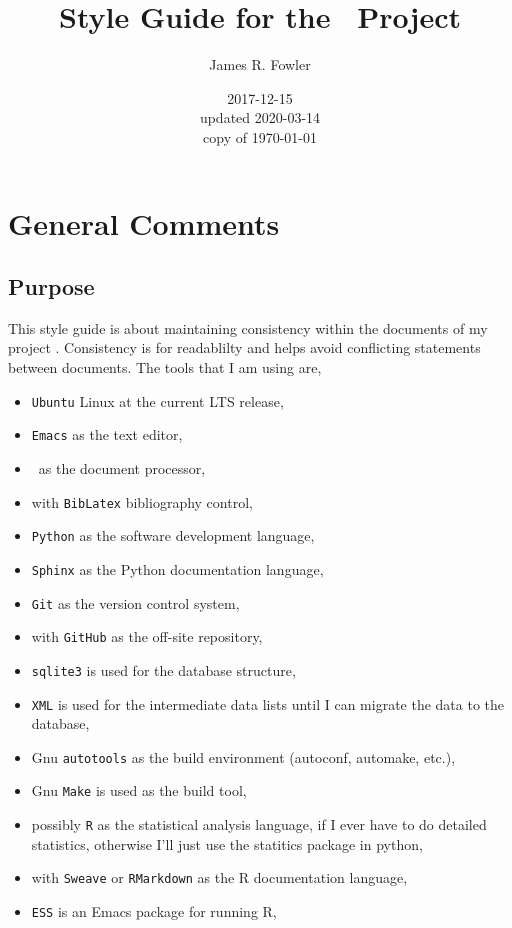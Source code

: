 \documentclass[twoside]{book}
\begin{document}
\frontmatter

\title{Style Guide for the \ProjectTitle\ Project}
\author{James R. Fowler}
\date{2017-12-15\\ updated 2020-03-14\\ copy of \today}

\maketitle

\tableofcontents

\mainmatter

\chapter{General Comments}

\section{Purpose}
This style guide is about maintaining consistency within the documents
of my project \ProjectTitle. Consistency is for readablilty and
helps avoid conflicting statements between documents. The tools
that I am using are,

\begin{itemize}
\item \texttt{Ubuntu} Linux at the current LTS release,
\item \texttt{Emacs} as the text editor,
\item \LaTeXe\ as the document processor,
\item with \texttt{BibLatex} bibliography control,
\item \texttt{Python} as the software development language,
\item \texttt{Sphinx} as the Python documentation language,
\item \texttt{Git} as the version control system,
\item with \texttt{GitHub} as the off-site repository,
\item \texttt{sqlite3} is used for the database structure,
\item \texttt{XML} is used for the intermediate data lists until
  I can migrate the data to the database,
\item Gnu \texttt{autotools} as the build environment (autoconf, automake,
  etc.),
\item Gnu \texttt{Make} is used as the build tool,
\item possibly \texttt{R} as the statistical analysis language,
  if I ever have to do detailed statistics, otherwise I'll just
  use the statitics package in python,
\item with \texttt{Sweave} or \texttt{RMarkdown} as the R documentation language,
\item \texttt{ESS} is an Emacs package for running R,
\end{itemize}
    
\end{document}
